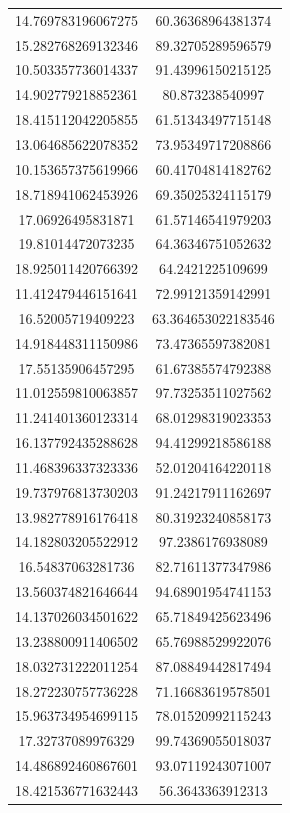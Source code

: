 \begin{table}
\begin{tabular}{cc}
14.769783196067275 & 60.36368964381374 \\
15.282768269132346 & 89.32705289596579 \\
10.503357736014337 & 91.43996150215125 \\
14.902779218852361 & 80.873238540997 \\
18.415112042205855 & 61.51343497715148 \\
13.064685622078352 & 73.95349717208866 \\
10.153657375619966 & 60.41704814182762 \\
18.718941062453926 & 69.35025324115179 \\
17.06926495831871 & 61.57146541979203 \\
19.81014472073235 & 64.36346751052632 \\
18.925011420766392 & 64.2421225109699 \\
11.412479446151641 & 72.99121359142991 \\
16.52005719409223 & 63.364653022183546 \\
14.918448311150986 & 73.47365597382081 \\
17.55135906457295 & 61.67385574792388 \\
11.012559810063857 & 97.73253511027562 \\
11.241401360123314 & 68.01298319023353 \\
16.137792435288628 & 94.41299218586188 \\
11.468396337323336 & 52.01204164220118 \\
19.737976813730203 & 91.24217911162697 \\
13.982778916176418 & 80.31923240858173 \\
14.182803205522912 & 97.2386176938089 \\
16.54837063281736 & 82.71611377347986 \\
13.560374821646644 & 94.68901954741153 \\
14.137026034501622 & 65.71849425623496 \\
13.238800911406502 & 65.76988529922076 \\
18.032731222011254 & 87.08849442817494 \\
18.272230757736228 & 71.16683619578501 \\
15.963734954699115 & 78.01520992115243 \\
17.32737089976329 & 99.74369055018037 \\
14.486892460867601 & 93.07119243071007 \\
18.421536771632443 & 56.3643363912313 \\

\end{tabular}
\end{table}
